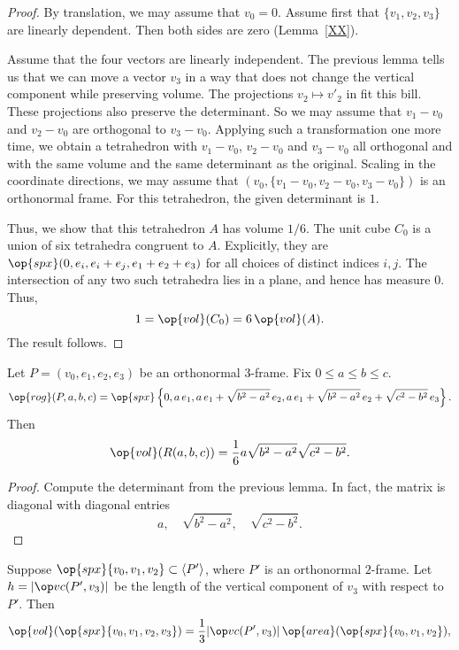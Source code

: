\begin{proof} By
translation, we may assume that $v_0=0$. 
Assume first that $\{v_1,v_2,v_3\}$ are linearly dependent. Then
both sides are zero (Lemma~\ref{XX}).

Assume that the four vectors are linearly independent.   The previous lemma tells
us that we can move a vector $v_3$ in a way that does not change the
vertical component while preserving volume. The projections
$v_2\mapsto v'_2$ in fit this bill.  These projections also
preserve the determinant. So we may assume that $v_1-v_0$ and $v_2-v_0$ are
orthogonal to $v_3-v_0$. Applying such a transformation one more
time, we obtain a tetrahedron with $v_1-v_0$, $v_2-v_0$ and
$v_3-v_0$ all orthogonal and with the same volume and the same determinant
as the original. Scaling in the coordinate directions, we may assume
that $(v_0,\{v_1-v_0,v_2-v_0,v_3-v_0\})$ is an orthonormal frame.
For this tetrahedron,
the given determinant is $1$.

Thus, we show that this tetrahedron $A$ has volume $1/6$.  The unit
cube $C_0$ is a union of six tetrahedra congruent to $A$.
Explicitly, they are $\op{spx}(0,e_i,e_i+e_j,e_1+e_2+e_3)$ for all
choices of distinct indices $i,j$. The intersection of any two such
tetrahedra lies in a plane, and hence has measure $0$.  Thus,
    $$1 = \op{vol}(C_0) = 6\,\op{vol}(A).$$
The result follows.
\end{proof}

\begin{lemma}  Let
$P=(v_0,e_1,e_2,e_3)$ be an orthonormal $3$-frame.   Fix $0\le a\le
b\le c$.
   $$\op{rog}(P,a,b,c) = \op{spx}\left\{0,a\, e_1,a\, e_1 + \sqrt{b^2-a^2}\, e_2,
     a\, e_1 + \sqrt{b^2-a^2}\, e_2 + \sqrt{c^2-b^2}\, e_3\right\}.$$
Then
    $$\op{vol}(R(a,b,c)) = \frac{1}{6} a
    \sqrt{b^2-a^2}\sqrt{c^2-b^2}.$$
\end{lemma}

\begin{proof}
Compute the determinant from the previous
lemma.  In fact, the matrix is diagonal with diagonal entries
	$$a,\quad \sqrt{b^2-a^2},\quad
	\sqrt{c^2-b^2}.$$
\end{proof}



\begin{lemma} Suppose
$\op{spx}\{v_0,v_1,v_2\}\subset \aspan{P'}$, where $P'$ is an
orthonormal $2$-frame. Let $h = |\vc(P',v_3)|$ be the length of
the vertical component of $v_3$ with respect to $P'$.  Then
    $$\op{vol}(\op{spx}\{v_0,v_1,v_2,v_3\}) = \frac{1}{3} |\vc(P',v_3)|
     \,
    \op{area}(\op{spx}\{v_0,v_1,v_2\}),
    $$

\end{lemma}

